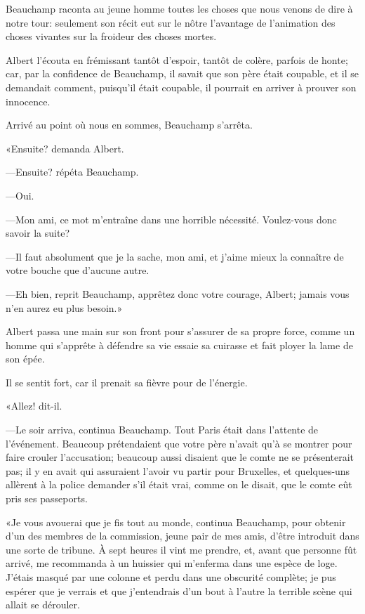 Beauchamp raconta au jeune homme toutes les choses que nous venons de dire à notre tour: seulement son récit eut sur le nôtre l'avantage de l'animation des choses vivantes sur la froideur des choses mortes. 

Albert l'écouta en frémissant tantôt d'espoir, tantôt de colère, parfois de honte; car, par la confidence de Beauchamp, il savait que son père était coupable, et il se demandait comment, puisqu'il était coupable, il pourrait en arriver à prouver son innocence. 

Arrivé au point où nous en sommes, Beauchamp s'arrêta. 

«Ensuite? demanda Albert. 

—Ensuite? répéta Beauchamp. 

—Oui. 

—Mon ami, ce mot m'entraîne dans une horrible nécessité. Voulez-vous donc savoir la suite? 

—Il faut absolument que je la sache, mon ami, et j'aime mieux la connaître de votre bouche que d'aucune autre. 

—Eh bien, reprit Beauchamp, apprêtez donc votre courage, Albert; jamais vous n'en aurez eu plus besoin.» 

Albert passa une main sur son front pour s'assurer de sa propre force, comme un homme qui s'apprête à défendre sa vie essaie sa cuirasse et fait ployer la lame de son épée. 

Il se sentit fort, car il prenait sa fièvre pour de l'énergie. 

«Allez! dit-il. 

—Le soir arriva, continua Beauchamp. Tout Paris était dans l'attente de l'événement. Beaucoup prétendaient que votre père n'avait qu'à se montrer pour faire crouler l'accusation; beaucoup aussi disaient que le comte ne se présenterait pas; il y en avait qui assuraient l'avoir vu partir pour Bruxelles, et quelques-uns allèrent à la police demander s'il était vrai, comme on le disait, que le comte eût pris ses passeports. 

«Je vous avouerai que je fis tout au monde, continua Beauchamp, pour obtenir d'un des membres de la commission, jeune pair de mes amis, d'être introduit dans une sorte de tribune. À sept heures il vint me prendre, et, avant que personne fût arrivé, me recommanda à un huissier qui m'enferma dans une espèce de loge. J'étais masqué par une colonne et perdu dans une obscurité complète; je pus espérer que je verrais et que j'entendrais d'un bout à l'autre la terrible scène qui allait se dérouler. 

